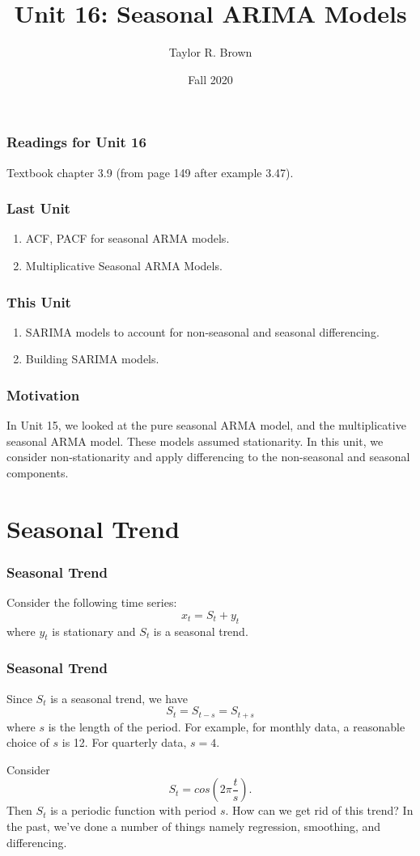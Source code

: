 \documentclass[%
xcolor=pdftex]{beamer}
\title{Unit 16: Seasonal ARIMA Models}
\author[STAT 5170: Applied Time Series, Unit 16]{Taylor R. Brown}
\institute{Department of Statistics, University of Virginia}
\date{Fall 2020}
\begin{document}
\frame{\titlepage}


\begin{frame}
\frametitle{Readings for Unit 16}

Textbook chapter 3.9 (from page 149 after example 3.47).

\end{frame}



\begin{frame}
\frametitle{Last Unit}
\begin{enumerate}
\item ACF, PACF for seasonal ARMA models.
\item Multiplicative Seasonal ARMA Models.
\end{enumerate}
\end{frame}

\begin{frame}
\frametitle{This Unit}

\begin{enumerate}
\item SARIMA models to account for non-seasonal and seasonal differencing.
\item Building SARIMA models.
\end{enumerate}


\end{frame}


\begin{frame}
\frametitle{Motivation}

In Unit 15, we looked at the pure seasonal ARMA model, and the multiplicative seasonal ARMA model. These models assumed stationarity. In this unit, we consider non-stationarity and apply differencing to the non-seasonal and seasonal components.

\end{frame}

\section{Seasonal Trend}
\frame{\tableofcontents[currentsection]}

\begin{frame}
\frametitle{Seasonal Trend}

Consider the following time series:
$$
x_t=S_t+ y_t
$$
where $y_t$ is stationary and $S_t$ is a seasonal trend.

\end{frame}

\begin{frame}
\frametitle{Seasonal Trend}
Since $S_t$ is a seasonal trend, we have
$$
S_t=S_{t-s}=S_{t+s}
$$
where $s$ is the length of the period. For example, for monthly
data, a reasonable choice of $s$ is 12. For quarterly data,
$s=4$. 

Consider
$$
S_t=cos(2 \pi \frac{t}{s}).
$$
Then $S_t$ is a periodic function with period $s$. How can we get rid of this trend?  In the past, we've done  a
number of things namely regression, smoothing, and
differencing.

\end{frame}
\end{document}
